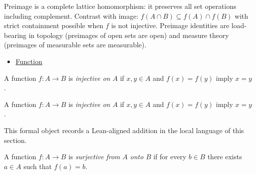 \begin{remark*}[Interpretation]
Preimage is a complete lattice homomorphism: it preserves all set
operations including complement. Contrast with image: $f(A\cap B)
\subseteq f(A)\cap f(B)$ with strict containment possible when $f$
is not injective. Preimage identities are load-bearing in topology
(preimages of open sets are open) and measure theory (preimages of
measurable sets are measurable).
\end{remark*}

\begin{dependencies}
\begin{itemize}
  \item \hyperref[def:function]{Function}
\end{itemize}
\end{dependencies}

\begin{definition}
\label{def:is-injective-on}
A function $f:A\to B$ is \emph{injective on $A$} if $x,y\in A$ and $f(x)=f(y)$ imply $x=y$.
\end{definition}

\begin{remark*}
A function $f:A\to B$ is \emph{injective on $A$} if $x,y\in A$ and $f(x)=f(y)$ imply $x=y$.
\end{remark*}

\begin{remark*}[Interpretation]
This formal object records a Lean-aligned addition in the local language of this section.
\end{remark*}

\begin{dependencies}
\NoLocalDependencies
\end{dependencies}
\begin{definition}
\label{def:is-surjective-on}
A function $f:A\to B$ is \emph{surjective from $A$ onto $B$} if for every $b\in B$ there exists $a\in A$ such that $f(a)=b$.
\end{definition}

